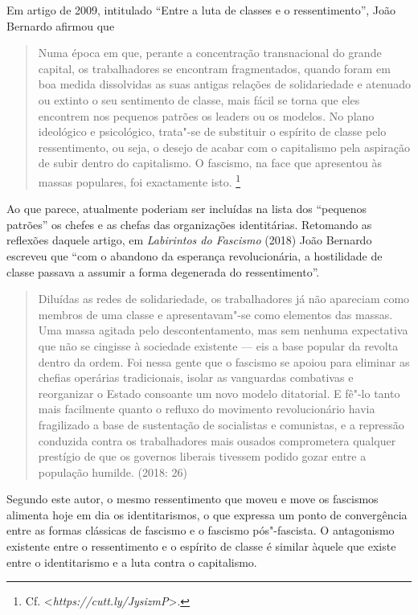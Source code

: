 Em artigo de 2009, intitulado ``Entre a luta de classes e o
ressentimento'', João Bernardo afirmou que

\begin{quote}
Numa época em que, perante a concentração transnacional do grande
capital, os trabalhadores se encontram fragmentados, quando foram em boa
medida dissolvidas as suas antigas relações de solidariedade e atenuado
ou extinto o seu sentimento de classe, mais fácil se torna que eles
encontrem nos pequenos patrões os leaders ou os modelos. No plano
ideológico e psicológico, trata"-se de substituir o espírito de classe
pelo ressentimento, ou seja, o desejo de acabar com o capitalismo pela
aspiração de subir dentro do capitalismo. O fascismo, na face que
apresentou às massas populares, foi exactamente isto. \footnote{Cf.
  \textless{}\emph{https://cutt.ly/JysizmP}\textgreater{}.}
\end{quote}

Ao que parece, atualmente poderiam ser incluídas na lista dos ``pequenos
patrões'' os chefes e as chefas das organizações identitárias. Retomando
as reflexões daquele artigo, em \emph{Labirintos do Fascismo} (2018)
João Bernardo escreveu que ``com o abandono da esperança revolucionária,
a hostilidade de classe passava a assumir a forma degenerada do
ressentimento''.

\begin{quote}
Diluídas as redes de solidariedade, os trabalhadores já não apareciam
como membros de uma classe e apresentavam"-se como elementos das massas.
Uma massa agitada pelo descontentamento, mas sem nenhuma expectativa que
não se cingisse à sociedade existente --- eis a base popular da revolta
dentro da ordem. Foi nessa gente que o fascismo se apoiou para eliminar
as chefias operárias tradicionais, isolar as vanguardas combativas e
reorganizar o Estado consoante um novo modelo ditatorial. E fê"-lo tanto
mais facilmente quanto o refluxo do movimento revolucionário havia
fragilizado a base de sustentação de socialistas e comunistas, e a
repressão conduzida contra os trabalhadores mais ousados comprometera
qualquer prestígio de que os governos liberais tivessem podido gozar
entre a população humilde. (2018: 26)
\end{quote}

Segundo este autor, o mesmo ressentimento que moveu e move os fascismos
alimenta hoje em dia os identitarismos, o que expressa um ponto de
convergência entre as formas clássicas de fascismo e o fascismo
pós"-fascista. O antagonismo existente entre o ressentimento e o espírito
de classe é similar àquele que existe entre o identitarismo e a luta
contra o capitalismo.

